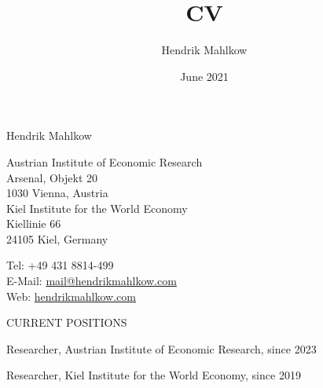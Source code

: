 \documentclass{article}
\title{CV}
\author{Hendrik Mahlkow}
\date{June 2021}
\begin{document}
{\selectfont 
	    \LARGE{Hendrik Mahlkow}
	}\\
\bigskip


\begin{minipage}[t]{0.66\textwidth}
    Austrian Institute of Economic Research \\
    Arsenal, Objekt 20 \\
    1030 Vienna, Austria \\
    \newline
    Kiel Institute for the World Economy \\
    Kiellinie 66 \\
    24105 Kiel, Germany
\end{minipage}
\hfill
\begin{minipage}[t]{0.33\textwidth} 
    Tel: +49 431 8814-499 \\
    E-Mail: \href{mailto:mail@hendrikmahlkow.com}{mail@hendrikmahlkow.com} \\
    Web: \href{http://hendrikmahlkow.com}{hendrikmahlkow.com} 
\end{minipage}
\bigskip
\bigskip


\begin{comment}
\begin{minipage}[t]{0.12\textwidth}
    {\fontfamily{phv}\selectfont ACADEMIC POSITION} \\
\end{minipage}
\hspace{5mm}
\begin{minipage}[t]{0.8\textwidth} 
    Researcher, Kiel Institute for the World Economy, since July 2019
\end{minipage}
\medskip
\end{comment}

\begin{minipage}[t]{0.12\textwidth}
    {\selectfont CURRENT POSITIONS} \\
\end{minipage}
\hspace{5mm}
\begin{minipage}[t]{0.8\textwidth} 
    Researcher, Austrian Institute of Economic Research,  since 2023 \par
    Researcher, Kiel Institute for the World Economy,  since 2019 \par
\end{minipage}
\medskip
\end{document}
